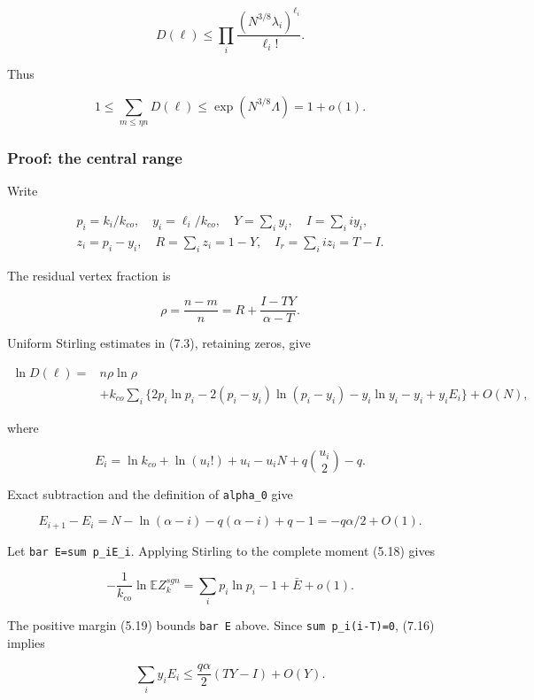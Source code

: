 \documentclass[
  11pt,
  a4paper,
]{article}
\begin{document}
\[
 D(\ell)\le\prod_i\frac{(N^{3/8}\lambda_i)^{\ell_i}}
                              {\ell_i!}.
\]

Thus

\[
 1\le\sum_{m\le\eta n}D(\ell)
 \le\exp(N^{3/8}\Lambda)=1+o(1).                       \tag{7.11}
\]

\subsubsection{Proof: the central range}\label{proof-the-central-range}

Write

\[\begin{gathered}
p_i=k_i/k_{co},\quad y_i=\ell_i/k_{co},\quad
 Y=\sum_i y_i,\quad I=\sum_i i y_i,\quad\\
z_i=p_i-y_i,\quad R=\sum_i z_i=1-Y,\quad
 I_r=\sum_i i z_i=T-I.
\end{gathered}
\tag{7.12}\]

The residual vertex fraction is

\[
 \rho=\frac{n-m}{n}
 =R+\frac{I-TY}{\alpha-T}.                              \tag{7.13}
\]

Uniform Stirling estimates in (7.3), retaining zeros, give

\[
\begin{split}
 \ln D(\ell)={}&n\rho\ln\rho\\
 &+k_{co}\sum_i\{2p_i\ln p_i-2(p_i-y_i)\ln(p_i-y_i)
                  -y_i\ln y_i-y_i+y_iE_i\}+O(N),        \end{split}
\tag{7.14}
\]

where

\[
 E_i=\ln k_{co}+\ln(u_i!)+u_i-u_iN
       +q\binom{u_i}{2}-q.                               \tag{7.15}
\]

Exact subtraction and the definition of \texttt{alpha\_0} give

\[
 E_{i+1}-E_i=N-\ln(\alpha-i)-q(\alpha-i)+q-1
            =-q\alpha/2+O(1).                            \tag{7.16}
\]

Let \texttt{bar\ E=sum\ p\_iE\_i}. Applying Stirling to the complete
moment (5.18) gives

\[
 -\frac1{k_{co}}\ln\mathbb EZ_k^{sgn}
 =\sum_i p_i\ln p_i-1+\bar E+o(1).                      \tag{7.17}
\]

The positive margin (5.19) bounds \texttt{bar\ E} above. Since
\texttt{sum\ p\_i(i-T)=0}, (7.16) implies

\[
 \sum_i y_iE_i\le\frac{q\alpha}{2}(TY-I)+O(Y).          \tag{7.18}
\]
\end{document}
